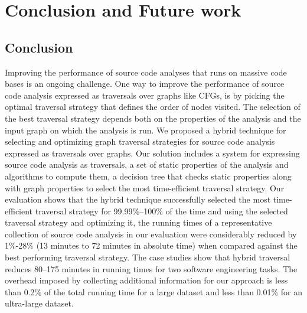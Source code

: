 \chapter{Conclusion and Future work}
\label{conclusion}
\section{Conclusion}
Improving the performance of source code analyses that runs on massive code bases
is an ongoing challenge. One way to improve the performance of
source code analysis expressed as traversals over graphs like CFGs, is by picking
the optimal traversal strategy that defines the order of nodes visited. The
selection of the best traversal strategy depends both on the properties of the
analysis and the input graph on which the analysis is run.
We proposed a hybrid technique for selecting and optimizing graph traversal
strategies for source code analysis expressed as traversals over graphs. Our
solution includes a system for expressing source code analysis as traversals, a set
of static properties of the analysis and algorithms to compute them, a decision
tree that checks static properties along with graph properties to select the
most time-efficient traversal strategy.
Our evaluation shows that the hybrid technique successfully selected the most
time-efficient traversal strategy for 99.99\%--100\% of the time and 
using the selected traversal strategy and optimizing it, the running times of a
representative collection of source code analysis in our evaluation
were considerably reduced by 1\%-28\% (13 minutes to 72 minutes in absolute time) when compared against the best performing traversal strategy. The case studies show that hybrid traversal reduces 80--175 minutes in running times for two software engineering tasks. The overhead imposed by 
collecting additional information for our approach is less than 0.2\% of 
the total running time for a large dataset and less than 0.01\% for an 
ultra-large dataset.\newline
